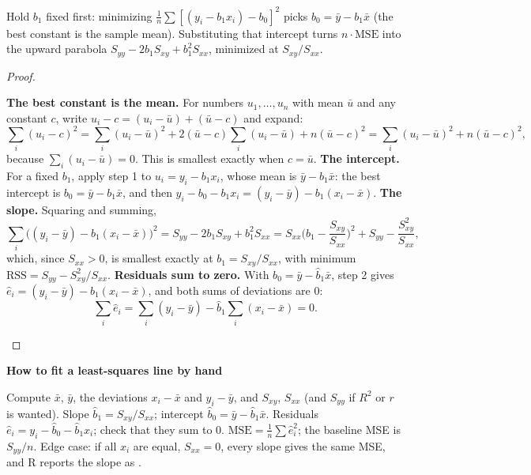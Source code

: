 \documentclass[10pt]{scrartcl}
\newenvironment{howto}[1]{\begin{mdframed}[style=howtostyle]{\color{NavyBlue}\textbf{#1}}\par\vspace{2pt}}{\end{mdframed}}
\begin{document}
\begin{ideabox}
  Hold $b_1$ fixed first: minimizing $\frac{1}{n}\sum [(y_i - b_1 x_i) - b_0]^2$ picks $b_0 = \bar y - b_1\bar x$ (the best constant is the sample mean). Substituting that intercept turns $n \cdot \mathrm{MSE}$ into the upward parabola $S_{yy} - 2b_1 S_{xy} + b_1^2 S_{xx}$, minimized at $S_{xy}/S_{xx}$.
\end{ideabox}
\begin{proof}
\begin{steps}
  \ii \textbf{The best constant is the mean.} For numbers $u_1,\dots,u_n$ with mean $\bar u$ and any constant $c$, write $u_i - c = (u_i - \bar u) + (\bar u - c)$ and expand:
  \[
    \sum_i (u_i - c)^2 = \sum_i (u_i - \bar u)^2 + 2(\bar u - c)\sum_i (u_i - \bar u) + n(\bar u - c)^2 = \sum_i (u_i - \bar u)^2 + n(\bar u - c)^2,
  \]
  because $\sum_i (u_i - \bar u) = 0$. This is smallest exactly when $c = \bar u$.
  \ii \textbf{The intercept.} For a fixed $b_1$, apply step 1 to $u_i = y_i - b_1x_i$, whose mean is $\bar y - b_1\bar x$: the best intercept is $b_0 = \bar y - b_1\bar x$, and then $y_i - b_0 - b_1x_i = (y_i - \bar y) - b_1(x_i - \bar x)$.
  \ii \textbf{The slope.} Squaring and summing,
  \[
    \sum_i \big((y_i - \bar y) - b_1(x_i - \bar x)\big)^2 = S_{yy} - 2b_1S_{xy} + b_1^2 S_{xx} = S_{xx}\Big(b_1 - \frac{S_{xy}}{S_{xx}}\Big)^2 + S_{yy} - \frac{S_{xy}^2}{S_{xx}},
  \]
  which, since $S_{xx} > 0$, is smallest exactly at $b_1 = S_{xy}/S_{xx}$, with minimum $\mathrm{RSS} = S_{yy} - S_{xy}^2/S_{xx}$.
  \ii \textbf{Residuals sum to zero.} With $b_0 = \bar y - \hat b_1\bar x$, step 2 gives $\hat e_i = (y_i - \bar y) - \hat b_1(x_i - \bar x)$, and both sums of deviations are $0$:
  \[
    \sum_i \hat e_i = \sum_i (y_i - \bar y) - \hat b_1\sum_i (x_i - \bar x) = 0 .
  \]
\end{steps}
\end{proof}

\begin{howto}{How to fit a least-squares line by hand}
\begin{steps}
  \ii Compute $\bar x$, $\bar y$, the deviations $x_i - \bar x$ and $y_i - \bar y$, and $S_{xy}$, $S_{xx}$ (and $S_{yy}$ if $R^2$ or $r$ is wanted).
  \ii Slope $\hat b_1 = S_{xy}/S_{xx}$; intercept $\hat b_0 = \bar y - \hat b_1\bar x$.
  \ii Residuals $\hat e_i = y_i - \hat b_0 - \hat b_1x_i$; check that they sum to $0$.
  \ii $\mathrm{MSE} = \frac1n\sum \hat e_i^2$; the baseline MSE is $S_{yy}/n$.
  \ii Edge case: if all $x_i$ are equal, $S_{xx} = 0$, every slope gives the same MSE, and R reports the slope as .
\end{steps}
\end{howto}
\end{document}
